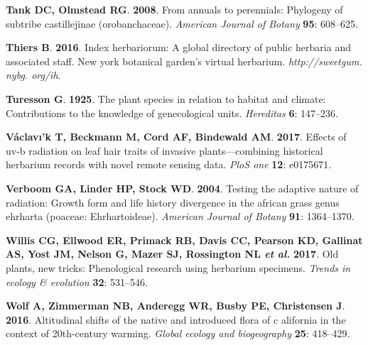 \documentclass[man,floatsintext]{apa6}
\theoremstyle{definition}
\theoremstyle{definition}
\theoremstyle{definition}
\theoremstyle{remark}
\begin{document}
\leavevmode\hypertarget{ref-tank2008annuals}{}%
\textbf{\textnormal{Tank DC}, \textnormal{Olmstead RG}}. \textbf{2008}.
From annuals to perennials: Phylogeny of subtribe castillejinae
(orobanchaceae). \emph{American Journal of Botany} \textbf{95}:
608--625.

\leavevmode\hypertarget{ref-thiers2016index}{}%
\textbf{\textnormal{Thiers B}}. \textbf{2016}. Index herbariorum: A
global directory of public herbaria and associated staff. New york
botanical garden's virtual herbarium. \emph{http://sweetgum. nybg.
org/ih}.

\leavevmode\hypertarget{ref-turesson1925plant}{}%
\textbf{\textnormal{Turesson G}}. \textbf{1925}. The plant species in
relation to habitat and climate: Contributions to the knowledge of
genecological units. \emph{Hereditas} \textbf{6}: 147--236.

\leavevmode\hypertarget{ref-vaclavik2017effects}{}%
\textbf{\textnormal{Václavı'k T}, \textnormal{Beckmann M},
\textnormal{Cord AF}, \textnormal{Bindewald AM}}. \textbf{2017}. Effects
of uv-b radiation on leaf hair traits of invasive plants---combining
historical herbarium records with novel remote sensing data. \emph{PloS
one} \textbf{12}: e0175671.

\leavevmode\hypertarget{ref-verboom2004testing}{}%
\textbf{\textnormal{Verboom GA}, \textnormal{Linder HP},
\textnormal{Stock WD}}. \textbf{2004}. Testing the adaptive nature of
radiation: Growth form and life history divergence in the african grass
genus ehrharta (poaceae: Ehrhartoideae). \emph{American Journal of
Botany} \textbf{91}: 1364--1370.

\leavevmode\hypertarget{ref-willis2017old}{}%
\textbf{\textnormal{Willis CG}, \textnormal{Ellwood ER},
\textnormal{Primack RB}, \textnormal{Davis CC}, \textnormal{Pearson KD},
\textnormal{Gallinat AS}, \textnormal{Yost JM}, \textnormal{Nelson G},
\textnormal{Mazer SJ}, \textnormal{Rossington NL} \emph{et al.}}
\textbf{2017}. Old plants, new tricks: Phenological research using
herbarium specimens. \emph{Trends in ecology \& evolution} \textbf{32}:
531--546.

\leavevmode\hypertarget{ref-wolf2016altitudinal}{}%
\textbf{\textnormal{Wolf A}, \textnormal{Zimmerman NB},
\textnormal{Anderegg WR}, \textnormal{Busby PE}, \textnormal{Christensen
J}}. \textbf{2016}. Altitudinal shifts of the native and introduced
flora of c alifornia in the context of 20th-century warming.
\emph{Global ecology and biogeography} \textbf{25}: 418--429.

\endgroup
\end{document}
